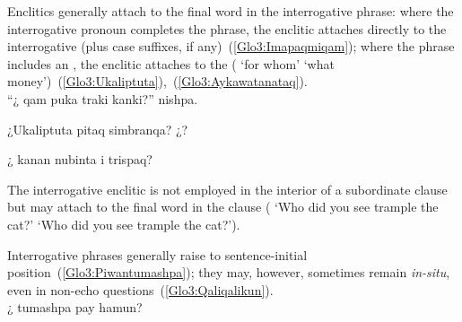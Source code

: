 \noindent
Enclitics generally attach to the final word in the interrogative phrase: where the interrogative pronoun completes the phrase, the enclitic attaches directly to the interrogative (plus case suffixes, if any)~(\ref{Glo3:Imapaqmiqam}); where the phrase includes an , the enclitic attaches to the  ( ‘for whom’  ‘what money’)~(\ref{Glo3:Ukaliptuta}),~(\ref{Glo3:Aykawatanataq}).\\

%
{“¿ qam puka traki kanki?” nishpa.}%
{}%
{}{}%

%
{¿Ukaliptuta pitaq simbranqa? ¿?}%
{}%
{}{}%

%
{¿ kanan nubinta i trispaq?}%
{}%
{}{}%

\noindent
The interrogative enclitic is not employed in the interior of a subordinate clause but may attach to the final word in the clause (    ‘Who did you see trample the cat?’     ‘Who did you see trample the cat?’).

\noindent
Interrogative phrases generally raise to sentence-initial position~(\ref{Glo3:Piwantumashpa}); they may, however, sometimes remain \emph{in-situ}, even in non-echo questions~(\ref{Glo3:Qaliqalikun}).\\

%
{¿ tumashpa pay hamun?}%
{}%
{}{}%

